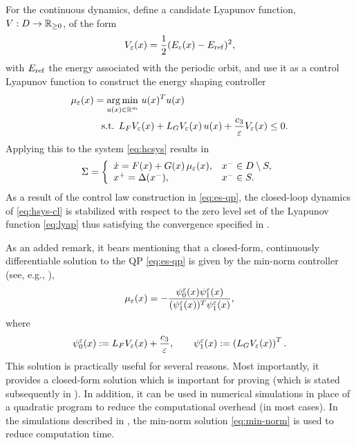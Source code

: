 For the continuous dynamics, define a candidate Lyapunov function, $V : D \to
\mathbb{R}_{\geq 0}$, of the form
%
\begin{align}
  \label{eq:lyap}
  V_{\varepsilon}(x) = \frac{1}{2} (E_{c}(x) - E_{\mathrm{ref}})^2,
\end{align}
%
with $E_{\mathrm{ref}}$ the energy associated with the periodic orbit, and use it as a
control Lyapunov function to construct the energy shaping controller
%
\begin{align}
  \label{eq:es-qp}
  \mu_{\varepsilon}(x) = \operatorname*{arg\,min}_{u(x) \in \mathbb{R}^{m}} \ & u(x)^T u(x)\\
  \nonumber
  \mbox{s.t. } L_{F} V_{\varepsilon}&(x) + L_{G} V_{\varepsilon}(x) \, u(x) +
  \frac{c_{3}}{\varepsilon} V_{\varepsilon}(x) \leq 0.
\end{align}
%
Applying this to the system \eqref{eq:hcsys} results in
%
\begin{align}
  \label{eq:hsys-cl}
  \Sigma = \left\{
  \begin{array}{l l}
    {\dot {x}} = F(x) + G(x) \, \mu_{\varepsilon}(x), & x^{-} \in D \setminus S,\\
    x^{+} = \Delta(x^{-}), &x^{-} \in S.
  \end{array}\right.
\end{align}
%
As a result of the control law construction in \eqref{eq:es-qp}, the closed-loop
dynamics of \eqref{eq:hsys-cl} is stabilized with respect to the zero level set
of the Lyapunov function \eqref{eq:lyap} thus satisfying the convergence
specified in .

As an added remark, it bears mentioning that a closed-form, continuously
differentiable solution to the QP \eqref{eq:es-qp} is given by the min-norm
controller (see, e.g., \cite{Freeman1996}),
\begin{align}
  \label{eq:min-norm}
  \mu_{\varepsilon}(x) = -\frac{\psi^{\varepsilon}_{0}(x) \psi^{\varepsilon}_{1}(x)}{(\psi^{\varepsilon}_{1}(x))^{T}
    \psi^{\varepsilon}_{1}(x)},
\end{align}
where
\begin{align*}
  \psi^{\varepsilon}_{0}(x) := L_{F} V_{\varepsilon}(x) + \frac{c_{3}}{\varepsilon}, \qquad
  \psi^{\varepsilon}_{1}(x) := \left( L_{G} V_{\varepsilon}(x) \right)^{T}.
\end{align*}
This solution is practically useful for several reasons.
%
Most importantly, it provides a closed-form solution which is important for
proving  (which is stated subsequently in
).
%
In addition, it can be used in numerical simulations in place of a quadratic
program to reduce the computational overhead (in most cases).
%
In the simulations described in , the
min-norm solution \eqref{eq:min-norm} is used to reduce computation time.


